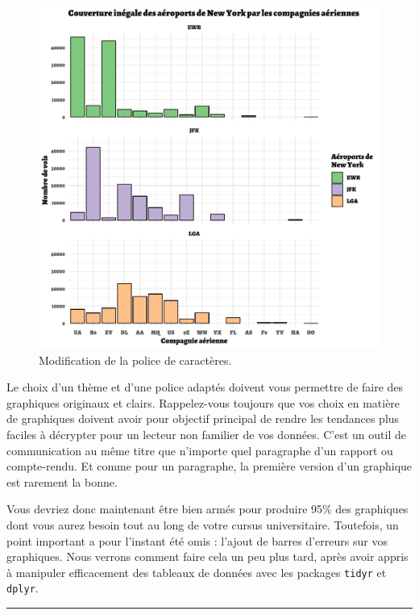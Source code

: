 \documentclass[a4paperpaper,]{article}
\begin{document}
\begin{figure}[htpb]

{\centering \includegraphics[width=0.9\linewidth]{figure/themefont-1} 

}

\caption{Modification de la police de caractères.}\label{fig:themefont}
\end{figure}

Le choix d'un thème et d'une police adaptés doivent vous permettre de faire des graphiques originaux et clairs. Rappelez-vous toujours que vos choix en matière de graphiques doivent avoir pour objectif principal de rendre les tendances plus faciles à décrypter pour un lecteur non familier de vos données. C'est un outil de communication au même titre que n'importe quel paragraphe d'un rapport ou compte-rendu. Et comme pour un paragraphe, la première version d'un graphique est rarement la bonne.

Vous devriez donc maintenant être bien armés pour produire 95\% des graphiques dont vous aurez besoin tout au long de votre cursus universitaire. Toutefois, un point important a pour l'instant été omis : l'ajout de barres d'erreurs sur vos graphiques. Nous verrons comment faire cela un peu plus tard, après avoir appris à manipuler efficacement des tableaux de données avec les packages \texttt{tidyr} et \texttt{dplyr}.

\begin{center}\rule{0.5\linewidth}{\linethickness}\end{center}
\end{document}
